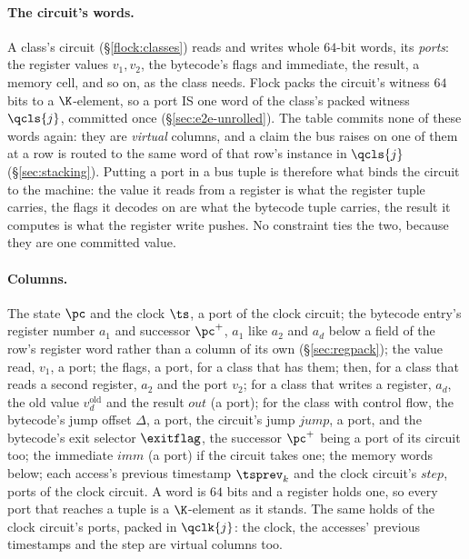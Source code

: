 \paragraph{The circuit's words.} A class's circuit (\S\ref{flock:classes}) reads and writes whole $64$-bit words, its \emph{ports}: the register values $v_1,v_2$, the bytecode's flags and immediate, the result, a memory cell, and so on, as the class needs. Flock packs the circuit's witness $64$ bits to a $\K$-element, so a port IS one word of the class's packed witness $\qcls{j}$, committed once (\S\ref{sec:e2e-unrolled}). The table commits none of these words again: they are \emph{virtual} columns, and a claim the bus raises on one of them at a row is routed to the same word of that row's instance in $\qcls{j}$ (\S\ref{sec:stacking}). Putting a port in a bus tuple is therefore what binds the circuit to the machine: the value it reads from a register is what the register tuple carries, the flags it decodes on are what the bytecode tuple carries, the result it computes is what the register write pushes. No constraint ties the two, because they are one committed value.

\paragraph{Columns.} The state $\pc$ and the clock $\ts$, a port of the clock circuit; the bytecode entry's register number $a_1$ and successor $\pc^{+}$, $a_1$ like $a_2$ and $a_d$ below a field of the row's register word rather than a column of its own (\S\ref{sec:regpack}); the value read, $v_1$, a port; the flags, a port, for a class that has them; then, for a class that reads a second register, $a_2$ and the port $v_2$; for a class that writes a register, $a_d$, the old value $v_d^{\mathrm{old}}$ and the result $\mathit{out}$ (a port); for the class with control flow, the bytecode's jump offset $\Delta$, a port, the circuit's jump $\mathit{jump}$, a port, and the bytecode's exit selector $\exitflag$, the successor $\pc^{+}$ being a port of its circuit too; the immediate $\mathit{imm}$ (a port) if the circuit takes one; the memory words below; each access's previous timestamp $\tsprev_k$ and the clock circuit's $\mathit{step}$, ports of the clock circuit. A word is $64$ bits and a register holds one, so every port that reaches a tuple is a $\K$-element as it stands. The same holds of the clock circuit's ports, packed in $\qclk{j}$: the clock, the accesses' previous timestamps and the step are virtual columns too.

